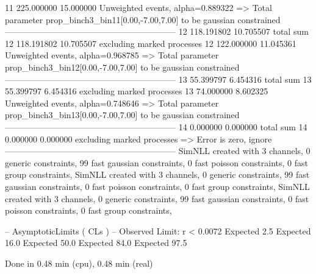 11         225.000000      15.000000       Unweighted events, alpha=0.889322
  => Total parameter prop_binch3_bin11[0.00,-7.00,7.00] to be gaussian constrained
------------------------------------------------------------
12         118.191802      10.705507       total sum                     
12         118.191802      10.705507       excluding marked processes    
12         122.000000      11.045361       Unweighted events, alpha=0.968785
  => Total parameter prop_binch3_bin12[0.00,-7.00,7.00] to be gaussian constrained
------------------------------------------------------------
13         55.399797       6.454316        total sum                     
13         55.399797       6.454316        excluding marked processes    
13         74.000000       8.602325        Unweighted events, alpha=0.748646
  => Total parameter prop_binch3_bin13[0.00,-7.00,7.00] to be gaussian constrained
------------------------------------------------------------
14         0.000000        0.000000        total sum                     
14         0.000000        0.000000        excluding marked processes    
  => Error is zero, ignore      
------------------------------------------------------------
SimNLL created with 3 channels, 0 generic constraints, 99 fast gaussian constraints, 0 fast poisson constraints, 0 fast group constraints, 
SimNLL created with 3 channels, 0 generic constraints, 99 fast gaussian constraints, 0 fast poisson constraints, 0 fast group constraints, 
SimNLL created with 3 channels, 0 generic constraints, 99 fast gaussian constraints, 0 fast poisson constraints, 0 fast group constraints, 

 -- AsymptoticLimits ( CLs ) --
Observed Limit: r < 0.0072
Expected  2.5%
Expected 16.0%
Expected 50.0%
Expected 84.0%
Expected 97.5%

Done in 0.48 min (cpu), 0.48 min (real)
